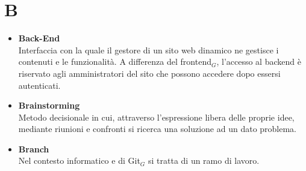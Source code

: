 \chapter{B} \label{B}
\begin{itemize}
	\item \textbf{Back-End} \\
	Interfaccia con la quale il gestore di un sito web dinamico ne gestisce i contenuti e le funzionalità. A differenza del frontend$_G$, l'accesso al backend è riservato agli amministratori del sito che possono accedere dopo essersi autenticati.
	
	\item \textbf{Brainstorming} \\
	Metodo decisionale in cui, attraverso l’espressione libera delle proprie idee, mediante riunioni e confronti si ricerca una soluzione ad un dato problema.
	
	\item \textbf{Branch} \\
	Nel contesto informatico e di Git$_G$ si tratta di un ramo di lavoro.
\end{itemize}